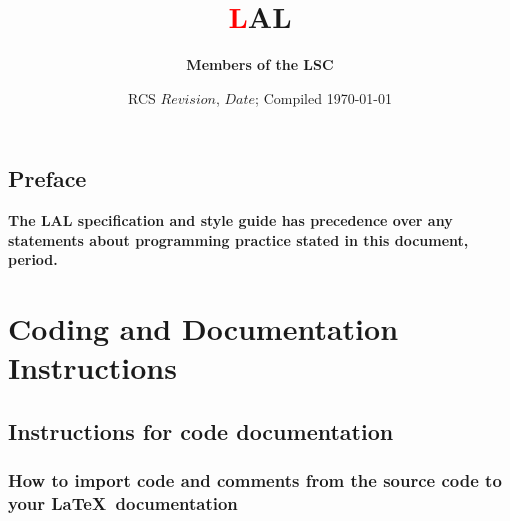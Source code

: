 \documentclass[oneside]{book}
\def\rcs#1{\def\next##1#1{\mbox{##1}}\next}
\begin{document}

\title{\sffamily\bfseries\Huge
\textcolor{red}{\lsdfont L}AL
\hspace{-2em}
}
\author{\bf Members of the LSC}
\date{RCS \rcs$Revision$, \rcs$Date$; Compiled \today}
\maketitle



\tableofcontents

\chapter*{Preface}
\textbf{The LAL specification and style guide has precedence over any
statements about programming practice stated in this document, period.}

\part{Coding and Documentation Instructions}

\chapter{Instructions for code documentation}
\section{How to import code and comments from the source code to 
your \LaTeX\ documentation}
\end{document}
